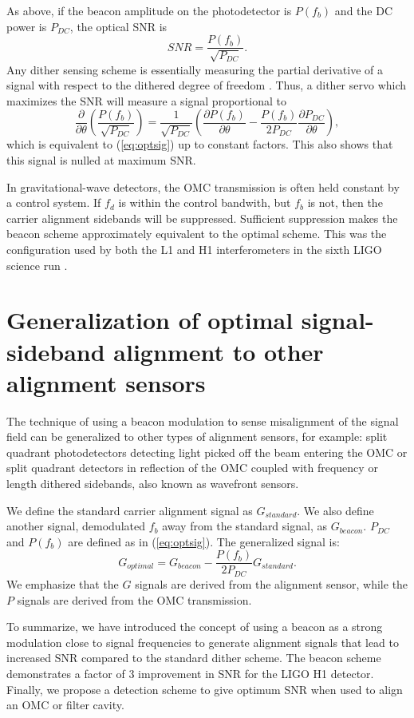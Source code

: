 As above, if the beacon amplitude on the photodetector is $P(f_b)$ and the DC power is $P_{DC}$, the optical SNR is
%
\begin{equation}
SNR = \frac{P(f_b)}{\sqrt{P_{DC}}}.
\end{equation}
%
Any dither sensing scheme is essentially measuring the partial derivative of a signal with respect to the dithered degree of freedom \cite{Kawabe:94}. %
Thus, a dither servo which maximizes the SNR will measure a signal proportional to
%
\begin{equation}
\frac{\partial}{\partial \theta} \left( \frac{P(f_b)}{\sqrt {P_{DC}} } \right) = \frac{1}{\sqrt {P_{DC}}} \left( \frac{\partial P(f_b)}{\partial \theta} - \frac{P(f_b)}{2P_{DC}} \frac{\partial P_{DC}}{\partial \theta} \right),
\end{equation}
%
which is equivalent to (\ref{eq:optsig}) up to constant factors. %
This also shows that this signal is nulled at maximum SNR.

In gravitational-wave detectors, the OMC transmission is often held constant by a control system. %
If $f_d$ is within the control bandwith, but $f_b$ is not, then the carrier alignment sidebands will be suppressed. %
Sufficient suppression makes the beacon scheme approximately equivalent to the optimal scheme. %
This was the configuration used by both the L1 and H1 interferometers in the sixth LIGO science run \cite{Tobin}.

\section{Generalization of optimal signal-sideband alignment to other alignment sensors}

The technique of using a beacon modulation to sense misalignment of the signal field can be generalized to other types of alignment sensors, for example: split quadrant photodetectors detecting light picked off the beam entering the OMC or split quadrant detectors in reflection of the OMC coupled with frequency or length dithered sidebands, also known as wavefront sensors.

We define the standard carrier alignment signal as $G_{standard}$. %
We also define another signal, demodulated $f_b$ away from the standard signal, as $G_{beacon}$. %
$P_{DC}$ and $P(f_b)$ are defined as in (\ref{eq:optsig}). %
The generalized signal is:
%
\begin{equation}
G_{optimal} = G_{beacon} - \frac{P(f_b)}{2P_{DC}} G_{standard}.
\end{equation}
%
We emphasize that the $G$ signals are derived from the alignment sensor, while the $P$ signals are derived from the OMC transmission.

To summarize, we have introduced the concept of using a beacon as a strong modulation close to signal frequencies to generate alignment signals that lead to increased SNR compared to the standard dither scheme. %
The beacon scheme demonstrates a factor of 3 improvement in SNR for the LIGO H1 detector. %
Finally, we propose a detection scheme to give optimum SNR when used to align an OMC or filter cavity.


